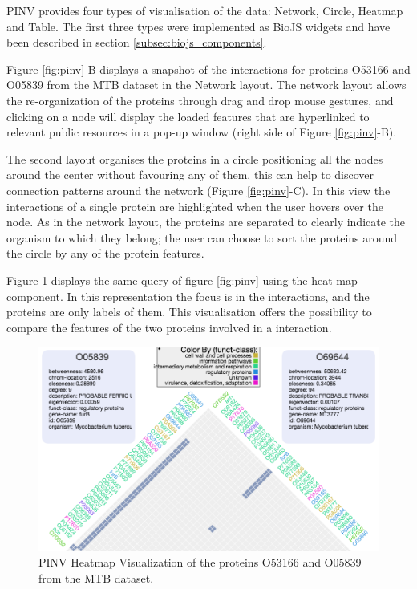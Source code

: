 PINV provides four types of visualisation of the data: Network, Circle, Heatmap and Table. The first three types were implemented as BioJS widgets and have been described in section \ref{subsec:biojs_components}. 

Figure \ref{fig:pinv}-B displays a snapshot of the interactions for proteins O53166 and O05839 from the MTB dataset in the Network layout. The network layout allows the re-organization of the proteins through drag and drop mouse gestures, and clicking on a node will display the loaded features that are hyperlinked to relevant public resources in a pop-up window (right side of Figure \ref{fig:pinv}-B).

The second layout organises the proteins in a circle positioning all the nodes around the center without favouring any of them, this can help to discover connection patterns around the network (Figure \ref{fig:pinv}-C). In this view the interactions of a single protein are highlighted when the user hovers over the node. As in the network layout, the proteins are separated to clearly indicate the organism to which they belong; the user can choose to sort the proteins around the circle by any of the protein features.

Figure \ref{fig:pinv_heatmap} displays the same query of figure \ref{fig:pinv} using the heat map component. In this representation the focus is in the interactions, and the proteins are only labels of them. This visualisation offers the possibility to compare the features of the two proteins involved in a interaction.

\begin{figure}[ht]
\centering
\includegraphics[width=\textwidth]{figures/pinv_heatmap.png}
\caption[PINV Heatmap Visualization.]{PINV Heatmap Visualization of the proteins O53166 and O05839 from the MTB dataset.
\label{fig:pinv_heatmap}}
\end{figure}


